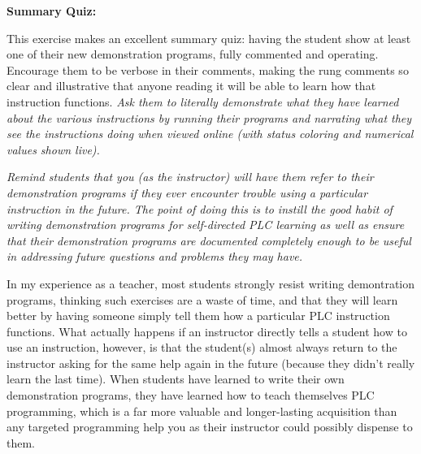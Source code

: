 





\vfil \eject

\noindent
{\bf Summary Quiz:}

This exercise makes an excellent summary quiz: having the student show at least one of their new demonstration programs, fully commented and operating.  Encourage them to be verbose in their comments, making the rung comments so clear and illustrative that anyone reading it will be able to learn how that instruction functions.  {\it Ask them to literally demonstrate what they have learned about the various instructions by running their programs and narrating what they see the instructions doing when viewed online (with status coloring and numerical values shown live).}

\vskip 10pt

{\it Remind students that you (as the instructor) will have them refer to their demonstration programs if they ever encounter trouble using a particular instruction in the future.  The point of doing this is to instill the good habit of writing demonstration programs for self-directed PLC learning as well as ensure that their demonstration programs are documented completely enough to be useful in addressing future questions and problems they may have.}

\vskip 10pt

In my experience as a teacher, most students strongly resist writing demontration programs, thinking such exercises are a waste of time, and that they will learn better by having someone simply tell them how a particular PLC instruction functions.  What actually happens if an instructor directly tells a student how to use an instruction, however, is that the student(s) almost always return to the instructor asking for the same help again in the future (because they didn't really learn the last time).  When students have learned to write their own demonstration programs, they have learned how to teach themselves PLC programming, which is a far more valuable and longer-lasting acquisition than any targeted programming help you as their instructor could possibly dispense to them.






